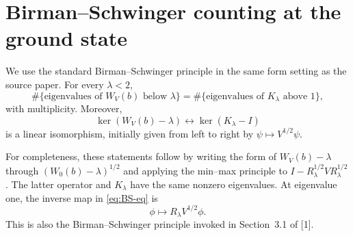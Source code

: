 \documentclass[11pt]{article}
\begin{document}
\section{Birman--Schwinger counting at the ground state}

We use the standard Birman--Schwinger principle in the same form setting as
the source paper.  For every $\lambda<2$,
\begin{equation}\label{eq:BS-count}
 \#\{\text{eigenvalues of }W_V(b)\text{ below }\lambda\}
 =\#\{\text{eigenvalues of }K_\lambda\text{ above }1\},
\end{equation}
with multiplicity.  Moreover,
\begin{equation}\label{eq:BS-eq}
 \ker(W_V(b)-\lambda)\longleftrightarrow\ker(K_\lambda-I)
\end{equation}
is a linear isomorphism, initially given from left to right by
$\psi\mapsto V^{1/2}\psi$.

For completeness, these statements follow by writing the form of
$W_V(b)-\lambda$ through $(W_0(b)-\lambda)^{1/2}$ and applying the min--max
principle to $I-R_\lambda^{1/2}VR_\lambda^{1/2}$.  The latter operator and
$K_\lambda$ have the same nonzero eigenvalues.  At eigenvalue one, the inverse
map in \eqref{eq:BS-eq} is
\begin{equation}\label{eq:reconstruct}
 \phi\longmapsto R_\lambda V^{1/2}\phi.
\end{equation}
This is also the Birman--Schwinger principle invoked in Section~3.1 of [1].
\end{document}
